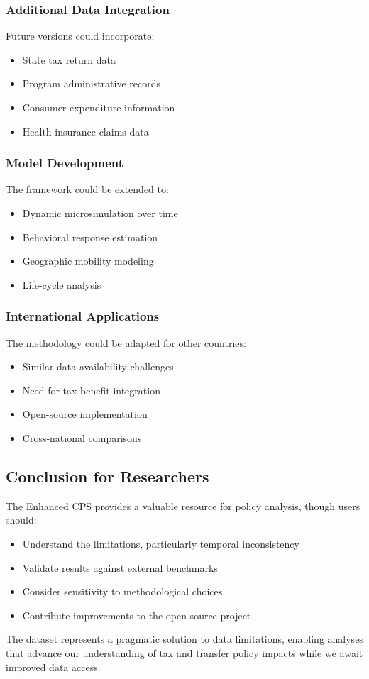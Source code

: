 \subsubsection{Additional Data Integration}

Future versions could incorporate:
\begin{itemize}
\item State tax return data
\item Program administrative records
\item Consumer expenditure information
\item Health insurance claims data
\end{itemize}

\subsubsection{Model Development}

The framework could be extended to:
\begin{itemize}
\item Dynamic microsimulation over time
\item Behavioral response estimation
\item Geographic mobility modeling
\item Life-cycle analysis
\end{itemize}

\subsubsection{International Applications}

The methodology could be adapted for other countries:
\begin{itemize}
\item Similar data availability challenges
\item Need for tax-benefit integration
\item Open-source implementation
\item Cross-national comparisons
\end{itemize}

\subsection{Conclusion for Researchers}

The Enhanced CPS provides a valuable resource for policy analysis, though users should:
\begin{itemize}
\item Understand the limitations, particularly temporal inconsistency
\item Validate results against external benchmarks
\item Consider sensitivity to methodological choices
\item Contribute improvements to the open-source project
\end{itemize}

The dataset represents a pragmatic solution to data limitations, enabling analyses that advance our understanding of tax and transfer policy impacts while we await improved data access.